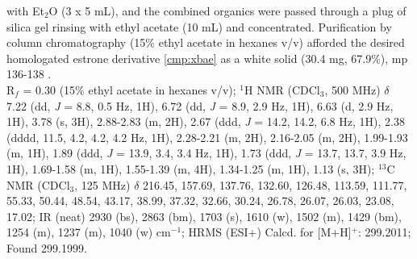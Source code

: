 with Et$_2$O (3 x 5 mL), and the combined organics were passed through a plug of silica gel rinsing
with ethyl acetate (10 mL) and concentrated. Purification by column chromatography (15\% ethyl
acetate in hexanes v/v) afforded the desired homologated estrone derivative \ref{cmp:xbae} as a
white solid (30.4 mg, 67.9\%), mp 136-138 \degc.\\
R$_f$ = 0.30 (15\% ethyl acetate in hexanes v/v); $^1$H NMR (CDCl$_3$, 500 MHz) $\delta$ 7.22 (dd,
\textit{J} = 8.8, 0.5 Hz, 1H), 6.72 (dd, \textit{J} = 8.9, 2.9 Hz, 1H), 6.63 (d, 2.9 Hz, 1H), 3.78
(s, 3H), 2.88-2.83 (m, 2H), 2.67 (ddd, \textit{J} = 14.2, 14.2, 6.8 Hz, 1H), 2.38 (dddd, 11.5, 4.2,
4.2, 4.2 Hz, 1H), 2.28-2.21 (m, 2H), 2.16-2.05 (m, 2H), 1.99-1.93 (m, 1H), 1.89 (ddd, \textit{J} =
13.9, 3.4, 3.4 Hz, 1H), 1.73 (ddd, \textit{J} = 13.7, 13.7, 3.9 Hz, 1H), 1.69-1.58 (m, 1H),
1.55-1.39 (m, 4H), 1.34-1.25 (m, 1H), 1.13 (s, 3H); $^{13}$C NMR (CDCl$_3$, 125 MHz) $\delta$
216.45, 157.69, 137.76, 132.60, 126.48, 113.59, 111.77, 55.33, 50.44, 48.54, 43.17, 38.99, 37.32,
32.66, 30.24, 26.78, 26.07, 26.03, 23.08, 17.02; IR (neat) 2930 (bs), 2863 (bm), 1703 (s), 1610 (w),
1502 (m), 1429 (bm), 1254 (m), 1237 (m), 1040 (w) cm$^{-1}$; HRMS (ESI+) Calcd. for 
[M+H]$^+$: 299.2011; Found 299.1999.

